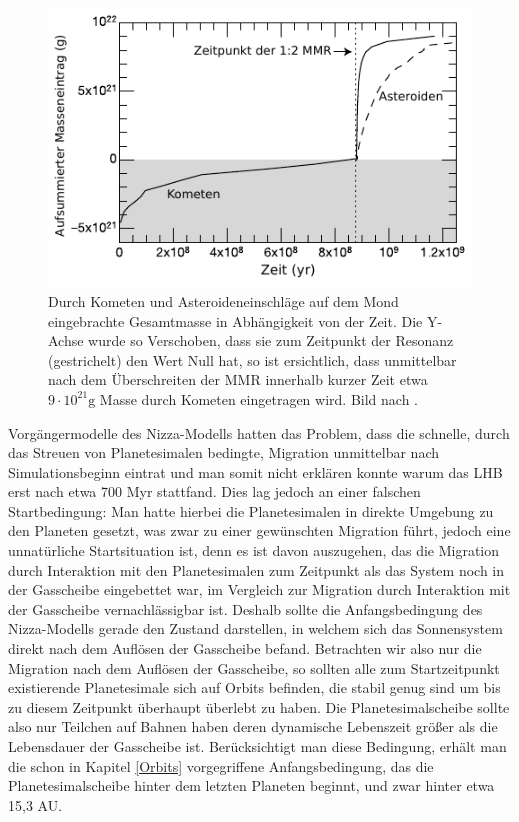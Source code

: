 \documentclass[12pt,a4paper,twoside]{article}
\begin{document}
\begin{figure}
\centering 
\includegraphics[scale=1]{img/Gomes2005-3}
\caption{Durch Kometen und Asteroideneinschläge auf dem Mond eingebrachte Gesamtmasse in Abhängigkeit von der Zeit. Die Y-Achse wurde so Verschoben, dass sie zum Zeitpunkt der Resonanz (gestrichelt) den Wert Null hat, so ist ersichtlich, dass unmittelbar nach dem Überschreiten der MMR innerhalb kurzer Zeit etwa $9\cdot10^21 \mathrm{g}$ Masse durch Kometen eingetragen wird. Bild nach \cite{Gomes2005}.}
\label{fig:LHBMasse}
\end{figure}
Vorgängermodelle des Nizza-Modells hatten das Problem, dass die schnelle, durch das Streuen von Planetesimalen bedingte, Migration unmittelbar nach Simulationsbeginn eintrat und man somit nicht erklären konnte warum das LHB erst nach etwa 700 Myr stattfand.
Dies lag jedoch an einer falschen Startbedingung: Man hatte hierbei die Planetesimalen in direkte Umgebung zu den Planeten gesetzt, was zwar zu einer gewünschten Migration führt, jedoch eine unnatürliche Startsituation ist,
denn es ist davon auszugehen, das die Migration durch Interaktion mit den Planetesimalen zum Zeitpunkt als das System noch in der Gasscheibe eingebettet war, im Vergleich zur Migration durch Interaktion mit der Gasscheibe vernachlässigbar ist.
Deshalb sollte die Anfangsbedingung des Nizza-Modells gerade den Zustand darstellen, in welchem sich das Sonnensystem direkt nach dem Auflösen der Gasscheibe befand. Betrachten wir also nur die Migration nach dem Auflösen der Gasscheibe, so sollten alle zum Startzeitpunkt existierende Planetesimale sich auf Orbits befinden, die stabil genug sind um bis zu diesem Zeitpunkt überhaupt überlebt zu haben. %
Die Planetesimalscheibe sollte also nur Teilchen auf Bahnen haben deren dynamische Lebenszeit größer als die Lebensdauer der Gasscheibe ist\cite{Gomes2005}. %
Berücksichtigt man diese Bedingung, erhält man die schon in Kapitel \ref{Orbits} vorgegriffene Anfangsbedingung, das die Planetesimalscheibe hinter dem letzten Planeten beginnt, und zwar hinter etwa 15,3 AU\cite{Gomes2005}.
\end{document}
